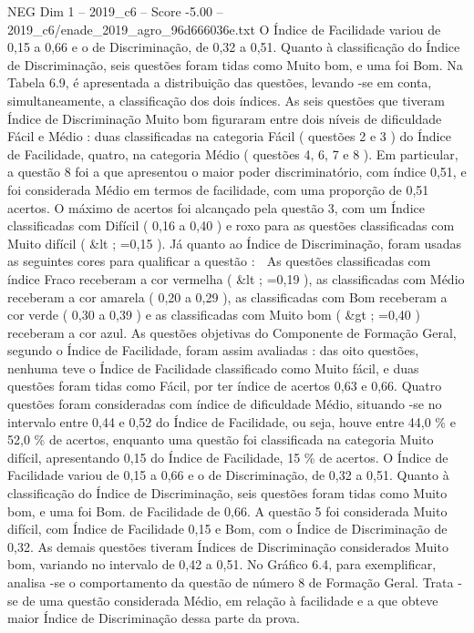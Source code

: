 \begin{textsample}{NEG Dim 1 – 2019\_c6 – Score -5.00 – 2019\_c6/enade\_2019\_agro\_96d666036e.txt}
O Índice de Facilidade variou de 0,15 a 0,66 e o de Discriminação, de 0,32 a 0,51.
Quanto à classificação do Índice de Discriminação, seis questões foram tidas como Muito bom, e uma foi Bom.
Na Tabela 6.9, é apresentada a distribuição das questões, levando -se em conta, simultaneamente, a classificação dos dois índices.
As seis questões que tiveram Índice de Discriminação Muito bom figuraram entre dois níveis de dificuldade Fácil e Médio : duas classificadas na categoria Fácil ( questões 2 e 3 ) do Índice de Facilidade, quatro, na categoria Médio ( questões 4, 6, 7 e 8 ).
Em particular, a questão 8 foi a que apresentou o maior poder discriminatório, com índice 0,51, e foi considerada Médio em termos de facilidade, com uma proporção de 0,51 acertos.
O máximo de acertos foi alcançado pela questão 3, com um Índice classificadas com Difícil ( 0,16 a 0,40 ) e roxo para as questões classificadas com Muito difícil ( \&lt ; =0,15 ).
Já quanto ao Índice de Discriminação, foram usadas as seguintes cores para qualificar a questão :  As questões classificadas com índice Fraco receberam a cor vermelha ( \&lt ; =0,19 ), as classificadas com Médio receberam a cor amarela ( 0,20 a 0,29 ), as classificadas com Bom receberam a cor verde ( 0,30 a 0,39 ) e as classificadas com Muito bom ( \&gt ; =0,40 ) receberam a cor azul.
As questões objetivas do Componente de Formação Geral, segundo o Índice de Facilidade, foram assim avaliadas : das oito questões, nenhuma teve o Índice de Facilidade classificado como Muito fácil, e duas questões foram tidas como Fácil, por ter índice de acertos 0,63 e 0,66.
Quatro questões foram consideradas com índice de dificuldade Médio, situando -se no intervalo entre 0,44 e 0,52 do Índice de Facilidade, ou seja, houve entre 44,0 \% e 52,0 \% de acertos, enquanto uma questão foi classificada na categoria Muito difícil, apresentando 0,15 do Índice de Facilidade, 15 \% de acertos.
O Índice de Facilidade variou de 0,15 a 0,66 e o de Discriminação, de 0,32 a 0,51.
Quanto à classificação do Índice de Discriminação, seis questões foram tidas como Muito bom, e uma foi Bom. de Facilidade de 0,66.
A questão 5 foi considerada Muito difícil, com Índice de Facilidade 0,15 e Bom, com o Índice de Discriminação de 0,32.
As demais questões tiveram Índices de Discriminação considerados Muito bom, variando no intervalo de 0,42 a 0,51.
No Gráfico 6.4, para exemplificar, analisa -se o comportamento da questão de número 8 de Formação Geral.
Trata -se de uma questão considerada Médio, em relação à facilidade e a que obteve maior Índice de Discriminação dessa parte da prova.

\end{textsample}
